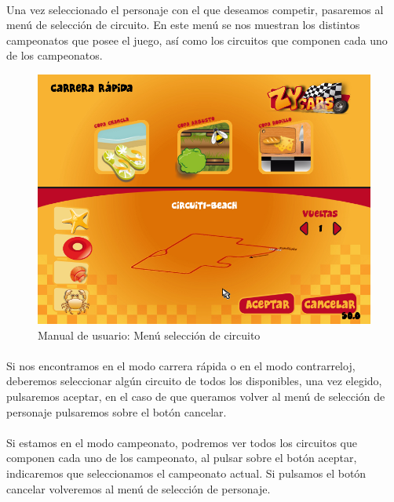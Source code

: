 \paragraph{}
Una vez seleccionado el personaje con el que deseamos competir, pasaremos al menú de selección de circuito. En este menú
se nos muestran los distintos campeonatos que posee el juego, así como los circuitos que componen cada uno de los 
campeonatos. 

\begin{figure}[H]
  \label{menu_circuito}
  \begin{center}
    \includegraphics[scale=0.4]{imagenes/capturas/menucircuito.png}
  \end{center}
 \caption{Manual de usuario: Menú selección de circuito}
\end{figure}

\paragraph{}
Si nos encontramos en el modo carrera rápida o en el modo contrarreloj, deberemos seleccionar algún circuito de todos los
disponibles, una vez elegido, pulsaremos aceptar, en el caso de que queramos volver al menú de selección de personaje
pulsaremos sobre el botón cancelar.

\paragraph{}
Si estamos en el modo campeonato, podremos ver todos los circuitos que componen cada uno de los campeonato, al pulsar sobre
el botón aceptar, indicaremos que seleccionamos el campeonato actual. Si pulsamos el botón cancelar volveremos al menú de selección
de personaje.

